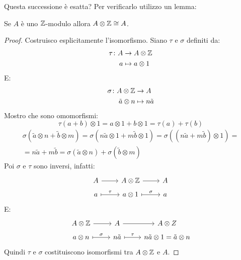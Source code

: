 Questa successione è esatta? Per verificarlo utilizzo un lemma:
\begin{lemma}
  Se $ A $ è uno $ \mathbb{Z} $-modulo allora $ A \otimes \mathbb{Z} \cong A $.
\end{lemma}
\begin{proof}
  Costruisco esplicitamente l'isomorfismo. Siano $ \tau $ e $ \sigma $ definiti da:
  \begin{align*}
    \tau \colon A & \to A \otimes \mathbb{Z} \\
    a & \mapsto a \otimes 1
  \end{align*}
  E:
  \begin{align*}
    \sigma \colon A \otimes \mathbb{Z} & \to A \\
    \tilde{a} \otimes n & \mapsto n \tilde{a}
  \end{align*}
  Mostro che sono omomorfismi:
  \[
    \tau(a + b) \otimes 1 = a \otimes 1 + b \otimes 1 = \tau(a) + \tau(b)
  \]
  \begin{gather*}
    \sigma(\tilde{a} \otimes n + \tilde{b} \otimes m ) = \sigma(n \tilde{a} \otimes 1 + m \tilde{b} \otimes
    1) = \sigma ((n \tilde{a} + m\tilde{b}) \otimes 1) = \\ = n \tilde{a} + m \tilde{b} =
    \sigma(\tilde{a} \otimes n) + \sigma(\tilde{b} \otimes m)
  \end{gather*}
  Poi $ \sigma $ e $ \tau $ sono inversi, infatti:
  \[
    \begin{tikzcd}[nodes={row sep = 5 pt}]
      A \rar{} & A \otimes \Z \rar & A \\
      a \arrow[mapsto]{r}{\tau} & a \otimes 1 \arrow[mapsto]{r}{\sigma} & a
    \end{tikzcd}
  \]
  E:
  \[
    \begin{tikzcd}[nodes={row sep = 5 pt}]
      A \otimes \Z \rar & A \rar & A \otimes Z \\
      a \otimes n \arrow[mapsto]{r}{\sigma} & n \tilde{a} \arrow[mapsto]{r}{\tau} & n \tilde{a} \otimes 1 = \tilde{a} \otimes n
    \end{tikzcd}
  \]
  Quindi $ \tau $ e $ \sigma $ costituiscono isomorfismi tra $ A \otimes \mathbb{Z} $ e $ A $.
\end{proof}
